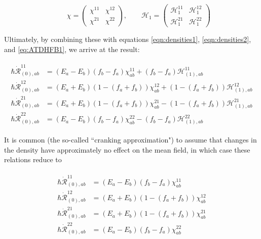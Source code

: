 \begin{equation}
\qquad \chi = 
\left(\begin{array}{cc}
\chi^{11} & \chi^{12} \\
\chi^{21} & \chi^{22}
\end{array}\right),
\qquad \mathcal{H}_1 = 
\left(\begin{array}{cc}
\mathcal{H}_1^{11} & \mathcal{H}_1^{12} \\
\mathcal{H}_1^{21} & \mathcal{H}_1^{22}
\end{array}\right)
\end{equation}

\noindent Ultimately, by combining these with equations \ref{eqn:densities1}, \ref{eqn:densities2}, and \ref{eq:ATDHFB1}, we arrive at the result:

\begin{align}\label{eqn:chi-rdot_uncranked}
\begin{aligned}
\hbar \dot{\mathcal{R}}_{(0),ab}^{11} &= (E_a-E_b)(f_b-f_a)\chi_{ab}^{11} + (f_b-f_a)\mathcal{H}^{11}_{(1),ab} \\
\hbar \dot{\mathcal{R}}_{(0),ab}^{12} &= (E_a+E_b)\left(1-(f_a+f_b)\right)\chi_{ab}^{12} + \left(1-(f_a+f_b)\right)\mathcal{H}^{12}_{(1),ab} \\
\hbar \dot{\mathcal{R}}_{(0),ab}^{21} &= (E_a+E_b)\left(1-(f_a+f_b)\right)\chi_{ab}^{21} - \left(1-(f_a+f_b)\right)\mathcal{H}^{21}_{(1),ab} \\
\hbar \dot{\mathcal{R}}_{(0),ab}^{22} &= (E_a-E_b)(f_b-f_a)\chi_{ab}^{22} - (f_b-f_a)\mathcal{H}^{22}_{(1),ab}
\end{aligned}
\end{align}

It is common (the so-called ``cranking approximation") to assume that changes in the density have approximately no effect on the mean field, in which case these relations reduce to

\begin{tcolorbox}
	\begin{align}\label{eqn:chi-rdot}
	\begin{aligned}
	\hbar \dot{\mathcal{R}}_{(0),ab}^{11} &= (E_a-E_b)(f_b-f_a)\chi_{ab}^{11} \\
	\hbar \dot{\mathcal{R}}_{(0),ab}^{12} &= (E_a+E_b)\left(1-(f_a+f_b)\right)\chi_{ab}^{12} \\
	\hbar \dot{\mathcal{R}}_{(0),ab}^{21} &= (E_a+E_b)\left(1-(f_a+f_b)\right)\chi_{ab}^{21} \\
	\hbar \dot{\mathcal{R}}_{(0),ab}^{22} &= (E_a-E_b)(f_b-f_a)\chi_{ab}^{22}
	\end{aligned}
	\end{align}
\end{tcolorbox}

